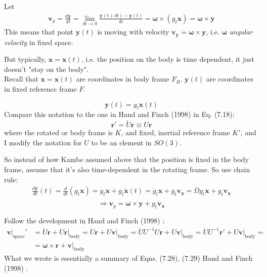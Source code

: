 Let 
\[
\begin{gathered}
\mathbf{v}_y = \frac{ d\mathbf{y}}{dt} = \lim_{ \delta t \to 0} \frac{ \mathbf{y}(t+ \delta t) - \mathbf{y}(t) }{ \delta t} = \mathbf{\omega} \times (g_t \mathbf{x} ) = \mathbf{\omega} \times \mathbf{y}
\end{gathered}
\]
This means that point $\mathbf{y}(t)$ is moving with velocity $\mathbf{v}_{\mathbf{y}} = \mathbf{\omega} \times \mathbf{y}$, i.e. $\mathbf{\omega}$ \emph{angular velocity} in fixed space.

But typically, $\mathbf{x} = \mathbf{x}(t)$, i.e. the position on the body is time dependent, it just doesn't "stay on the body". \\

Recall that $\mathbf{x} = \mathbf{x}(t)$ are coordinates in body frame $F_B$. $\mathbf{y}(t)$ are coordinates in fixed reference frame $F$.

\[
\mathbf{y}(t) = g_t \mathbf{x}(t)
\]
Compare this notation to the one in Hand and Finch (1998) \cite{dgdt:HaFi1998} in Eq. (7.18):
\[
\mathbf{r}' = \widetilde{U} \mathbf{r} \equiv U \mathbf{r}
\]
where the rotated or body frame is $K$, and fixed, inertial reference frame $K'$, and I modify the notation for $U$ to be an element in $SO(3)$.

So instead of how Kambe assumed above that the position is fixed in the body frame, assume that it's also time-dependent in the rotating frame. So use chain rule:
\[
\begin{gathered}
\frac{d \mathbf{y}}{dt}(t) = \frac{d}{dt}(g_t \mathbf{x} ) = \dot{g}_t \mathbf{x} + g_t \dot{\mathbf{x}}(t) = \dot{g}_t \mathbf{x} + g_t \mathbf{v}_{\mathbf{x} } = \overline{\Omega} g_t \mathbf{x} + g_t \mathbf{v}_{\mathbf{x}} \\
\end{gathered}
\]
\begin{equation}\label{dgdt:Eq:VelocityTransformationFromRotatingFrame}
	\Longrightarrow \mathbf{v}_y = \mathbf{\omega} \times \mathbf{y} + g_t \mathbf{v}_{\mathbf{x}}
\end{equation}

Follow the development in Hand and Finch (1998) \cite{dgdt:HaFi1998}:
\begin{equation}
\begin{aligned}
\left. \mathbf{v} \right|_{\text{space}}' & = \dot{U} \mathbf{r} + \left. U \dot{\mathbf{r} }\right|_{\text{body}} = \dot{U} \mathbf{r} + \left. U \mathbf{v} \right|_{\text{body}} = \dot{U} U^{-1} U \mathbf{r} + \left. U \mathbf{v} \right|_{\text{body}} = \dot{U} U^{-1} \mathbf{r}' + U \left. \mathbf{v} \right|_{\text{body}} = \\
& = \mathbf{\omega} \times \mathbf{r} + \left. \mathbf{v} \right|_{\text{body}}
\end{aligned}
\end{equation}
What we wrote is essentially a summary of Eqns. (7.28), (7.29)  Hand and Finch (1998) \cite{dgdt:HaFi1998}. 

